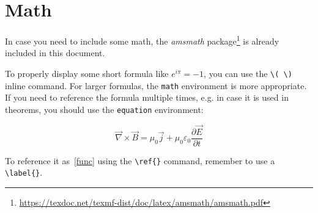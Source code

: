 \section{Math}

In case you need to include some math,
the \emph{amsmath} package\footnote{\url{https://texdoc.net/texmf-dist/doc/latex/amsmath/amsmath.pdf}} is already included in this document.

To properly display some short formula like \( e^{i \pi} = -1\),
you can use the \verb+\( \)+ inline command.
For larger formulas, the \verb+math+ environment is more appropriate.
If you need to reference the formula multiple times,
e.g. in case it is used in theorems,
you should use the \verb+equation+ environment:

\begin{equation}
	\vec\nabla\times\vec{B}= \mu_0\vec{j}+\mu_0\varepsilon_0\frac{\partial\vec{E}}{\partial t}
	\label{func}
\end{equation}

To reference it as~\ref{func} using the \verb+\ref{}+ command,
remember to use a \verb+\label{}+.
